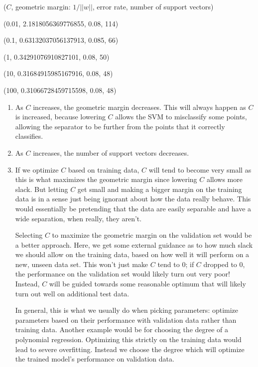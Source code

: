\documentclass{paper}
\begin{document}
\begin{enumerate}
            ($C$, geometric margin: $1/||w||$, error rate, number of support vectors)
            
            (0.01, 2.1818056369776855, 0.08, 114)
            
            (0.1, 0.63132037056137913, 0.085, 66)
            
            (1, 0.34291076910827101, 0.08, 50)
            
            (10, 0.31684915985167916, 0.08, 48)
            
            (100, 0.31066728459715598, 0.08, 48)

    \begin{enumerate}

        \item

            As $C$ increases, the geometric margin decreases. This will always happen as $C$ is increased, because lowering $C$ allows the SVM to misclassify some points, allowing the separator to be further from the points that it correctly classifies. 

        \item

            As $C$ increases, the number of support vectors decreases.

        \item

            If we optimize $C$ based on training data, $C$ will tend to become very small as this is what maximizes the geometric margin since lowering $C$ allows more slack. But letting $C$ get small and making a bigger margin on the training data is in a sense just being ignorant about how the data really behave. This would essentially be pretending that the data are easily separable and have a wide separation, when really, they aren't.

            Selecting $C$ to maximize the geometric margin on the validation set would be a better approach. Here, we get some external guidance as to how much slack we should allow on the training data, based on how well it will perform on a new, unseen data set. This won't just make $C$ tend to $0$; if $C$ dropped to $0$, the performance on the validation set would likely turn out very poor! Instead, $C$ will be guided towards some reasonable optimum that will likely turn out well on additional test data.

            In general, this is what we usually do when picking parameters: optimize parameters based on their performance with validation data rather than training data. Another example would be for choosing the degree of a polynomial regression. Optimizing this strictly on the training data would lead to severe overfitting. Instead we choose the degree which will optimize the trained model's performance on validation data.
    \end{enumerate}

\end{enumerate}
\end{document}
